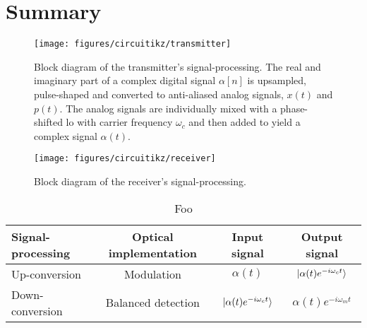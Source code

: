 \section*{Summary}



\begin{figure}[htb]
	\centering
	\texttt{[image: figures/circuitikz/transmitter]}
	\caption{Block diagram of the transmitter's signal-processing. The real and imaginary part of a complex digital signal $\alpha[n]$ is upsampled, pulse-shaped and converted to anti-aliased analog signals, $x(t)$ and $p(t)$. The analog signals are individually mixed with a phase-shifted \gls{lo} with carrier frequency $\omega_c$ and then added to yield a complex signal $\alpha(t)$.}\label{fig:transmitter_signal_processing}
\end{figure}

\begin{figure}[htb]
	\centering
	\texttt{[image: figures/circuitikz/receiver]}
	\caption{Block diagram of the receiver's signal-processing.}\label{fig:receiver_signal_processing}
\end{figure}

\begin{table}[htb]
  \centering
  \begin{tabular}{lccc}
    \toprule
    Signal-processing & Optical implementation & Input signal & Output signal \\
    \midrule
    Up-conversion & Modulation & $\alpha(t)$ & $\lvert\alpha(t)e^{-i\omega_c t}\rangle$ \\
    Down-conversion & Balanced detection & $\lvert\alpha(t)e^{-i\omega_c t}\rangle$ & $\alpha(t)e^{-i\omega_mt}$ \\
    \bottomrule
  \end{tabular}
  \caption{Foo}
\end{table}